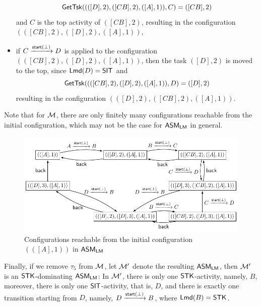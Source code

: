 \begin{example}
\begin{itemize}
			$$\mathsf{GetTsk}((([D],2),([CB],2),([A],1)), C) = ([CB],2)$$
			and $C$ is the top activity of $([CB], 2)$, resulting in the configuration $(([CB],2),([D],2),([A],1))$,
			\item if $C \xrightarrow{{\mathsf{start} }(\bot)} D$ is applied to the configuration $(([CB],2),([D],2),([A],1))$, then the task $([D],2)$ is moved to the top, since ${\sf Lmd}(D) = \mathsf{SIT}$ and
			$$\mathsf{GetTsk}((([CB],2),([D],2),([A],1)), D) = ([D],2)$$
			resulting in the configuration $(([D],2),([CB],2),([A],1))$.
		\end{itemize}
		Note that for ${\mathcal{M} }$, there are only finitely many configurations reachable from the initial configuration, which may not be the case for $\textsf{ASM}_\textsf{LM}$ in general.  
		
		\begin{figure}
			\centering
			\includegraphics[scale = 0.75]{lmasm-example.pdf}
			\caption{Configurations reachable from the initial configuration $(([A], 1))$ in $\textsf{ASM}_\textsf{LM}$}
			\label{lmasm-example}
		\end{figure}
Finally, if we remove $\tau_5$ from ${\mathcal{M} }$, let ${\mathcal{M} }'$ denote the resulting $\textsf{ASM}_\textsf{LM}$, then ${\mathcal{M} }'$ is an $\mathsf{STK}$-dominating $\textsf{ASM}_\textsf{LM}$: In ${\mathcal{M} }'$, there is only one $\mathsf{STK}$-activity, namely, $B$, moreover, there is only one $\mathsf{SIT}$-activity, that is, $D$, and there is exactly one transition starting from $D$, namely, $D \xrightarrow{{\mathsf{start} }(\bot)} B$, where ${\sf Lmd}(B)= {\sf STK}$. 
	\end{example}
